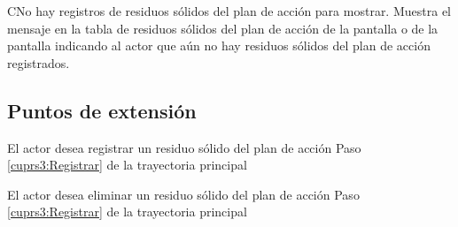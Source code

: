  
  \begin{UCtrayectoriaA}{C}{No hay registros de residuos sólidos del plan de acción para mostrar.}
    \UCpaso[\UCsist] Muestra el mensaje  en la tabla de residuos sólidos del plan de acción de la pantalla  o de la pantalla  
		     indicando al actor que aún no hay residuos sólidos del plan de acción registrados. 
 \end{UCtrayectoriaA}


\subsection{Puntos de extensión}

\UCExtensionPoint
{El actor desea registrar un residuo sólido del plan de acción}
{ Paso \ref{cuprs3:Registrar} de la trayectoria principal}
{}

\UCExtensionPoint
{El actor desea eliminar un residuo sólido del plan de acción}
{ Paso \ref{cuprs3:Registrar} de la trayectoria principal}
{}
